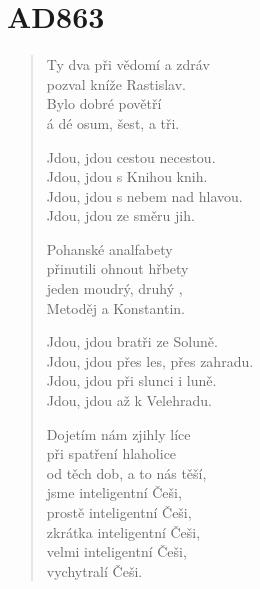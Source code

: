 \section{AD863}

\thispagestyle{empty}

\begin{multicols}{2}


\begin{verse}
	
Ty dva při vědomí a zdráv\\
pozval kníže Rastislav.\\
Bylo dobré povětří\\
á dé osum, šest, a tři.

Jdou, jdou cestou necestou.  \\
Jdou, jdou s Knihou knih. \\
Jdou, jdou s nebem nad hlavou. \\
Jdou, jdou ze směru jih.

\vspace{15pt}

Pohanské analfabety\\
přinutili ohnout hřbety\\
jeden moudrý, druhý ,\\
Metoděj a Konstantin.

Jdou, jdou bratři ze Soluně.\\
Jdou, jdou přes les, přes zahradu.\\
Jdou, jdou při slunci i luně.\\
Jdou, jdou až k Velehradu.

\columnbreak

Dojetím nám zjihly líce\\
při spatření hlaholice\\
od těch dob, a to nás těší,\\
jsme inteligentní Češi,\\
prostě inteligentní Češi,\\
zkrátka inteligentní Češi,\\
velmi inteligentní Češi,\\
vychytralí Češi.
\end{verse}


\end{multicols}